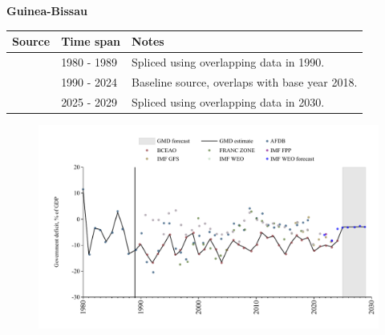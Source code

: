 \documentclass[12pt,a4paper,landscape]{article}
\begin{document}
\begin{adjustbox}{max totalsize={\paperwidth}{\paperheight},center}
\begin{minipage}[t][\textheight][t]{\textwidth}
\vspace*{0.5cm}
{}
\begin{center}
{\Large\bfseries Guinea-Bissau}
\end{center}
\vspace{0.5cm}
\begin{table}[H]
\centering
\small
\begin{tabular}{|l|l|l|}
\hline
\textbf{Source} & \textbf{Time span} & \textbf{Notes} \\
\hline
\rowcolor{white}\cite{AFDB}& 1980 - 1989 &Spliced using overlapping data in 1990.\\
\rowcolor{lightgray}\cite{BCEAO}& 1990 - 2024 &Baseline source, overlaps with base year 2018.\\
\rowcolor{white}\cite{IMF_WEO_forecast}& 2025 - 2029 &Spliced using overlapping data in 2030.\\
\hline
\end{tabular}
\end{table}
\begin{figure}[H]
\centering
\includegraphics[width=\textwidth,height=0.6\textheight,keepaspectratio]{graphs/GNB_govdef_GDP.pdf}
\end{figure}
\end{minipage}
\end{adjustbox}
\end{document}
